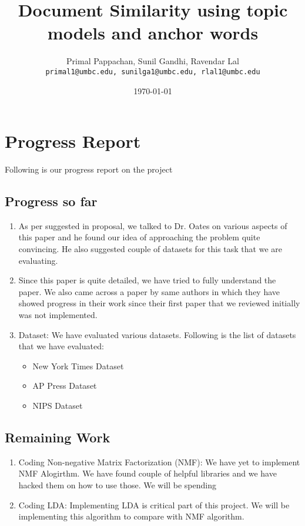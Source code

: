 \documentclass[a4paper,11pt]{article}
\begin{document}

\title{Document Similarity using topic models and anchor words}
\author{Primal Pappachan, Sunil Gandhi, Ravendar Lal \\ 
\texttt{primal1@umbc.edu, sunilga1@umbc.edu, rlal1@umbc.edu}}
\date{\today}
\maketitle



\section{Progress Report}
Following is our progress report on the project
\subsection{Progress so far}

\begin{enumerate}
\item As per suggested in proposal, we talked to Dr. Oates on various aspects of this paper and he found our idea of approaching the problem quite convincing. He also suggested couple of datasets for this task that we are evaluating.

\item Since this paper is quite detailed, we have tried to fully understand the paper. We also came across a paper by same authors in which they have showed progress in their work since their first paper that we reviewed initially was not implemented. 

\item Dataset: We have evaluated various datasets. Following is the list of datasets that we have evaluated:

\begin{itemize}
\item New York Times Dataset
\item AP Press Dataset
\item NIPS Dataset
\end{itemize}

\end{enumerate}


\subsection{Remaining Work}
\begin{enumerate}
\item Coding Non-negative Matrix Factorization (NMF): We have yet to implement NMF Alogirthm. We have found couple of helpful libraries and we have hacked them on how to use those. We will be spending 
\item Coding LDA: Implementing LDA is critical part of this project. We will be implementing this algorithm to compare with NMF algorithm. 

\end{enumerate}
\end{document}
